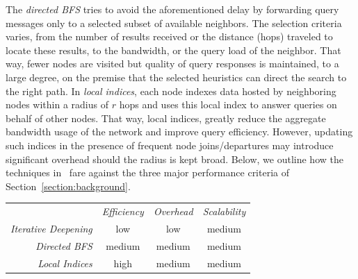 The \emph{directed BFS}
tries to avoid the aforementioned delay by forwarding 
query messages only to a selected subset of available neighbors. The selection
criteria varies, from the number of results received or the distance (hops)
traveled to locate these results, to the bandwidth, or the
query load of the neighbor. That way, fewer nodes are visited but quality of
query responses is maintained, to a large degree, on the premise that the
selected heuristics can direct the search to the right path.
%
In \emph{local indices},
each node indexes data hosted by neighboring nodes within a radius of $r$ hops
and uses this local index to answer queries on behalf of other nodes.
That way, local indices,
greatly reduce the aggregate bandwidth usage of the network and 
improve query efficiency. However, updating such indices in 
the presence of frequent node joins/departures 
may introduce significant overhead should the radius is kept broad.
Below, we outline how the techniques in~\cite{YG-M2002}
fare against the three major performance criteria 
of Section~\ref{section:background}.

\begin{center}
{\footnotesize
\begin{tabular}{rccc}
\multicolumn{1}{r}{} &
\multicolumn{1}{c}{\emph{Efficiency}} &
\multicolumn{1}{c}{\emph{Overhead}} &
\multicolumn{1}{c}{\emph{Scalability}}
\\
\cline{2-4}
\emph{Iterative Deepening} &
low &
low &
% 
medium \\
\emph{Directed BFS} &
medium &
medium &
medium \\
\emph{Local Indices} &
high &
medium &
medium \\
\end{tabular}
}
\end{center}

